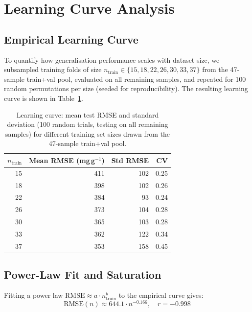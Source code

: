 \documentclass[12pt,a4paper]{article}
\begin{document}
\section{Learning Curve Analysis}
\label{sec:learning}

\subsection{Empirical Learning Curve}

To quantify how generalisation performance scales with dataset size, we
subsampled training folds of size $n_\text{train} \in \{15, 18, 22, 26,
30, 33, 37\}$ from the 47-sample train+val pool, evaluated on all
remaining samples, and repeated for 100 random permutations per size
(seeded for reproducibility).
The resulting learning curve is shown in Table~\ref{tab:learning_curve}.

\begin{table}[h]
\centering
\caption{Learning curve: mean test RMSE and standard deviation (100
  random trials, testing on all remaining samples) for different
  training set sizes drawn from the 47-sample train+val pool.}
\label{tab:learning_curve}
\begin{tabular}{rrrr}
\toprule
$n_\text{train}$ & Mean RMSE (mg\,g$^{-1}$) & Std RMSE & CV \\
\midrule
15 & 411 & 102 & 0.25 \\
18 & 398 & 102 & 0.26 \\
22 & 384 &  93 & 0.24 \\
26 & 373 & 104 & 0.28 \\
30 & 365 & 103 & 0.28 \\
33 & 362 & 122 & 0.34 \\
37 & 353 & 158 & 0.45 \\
\bottomrule
\end{tabular}
\end{table}

\subsection{Power-Law Fit and Saturation}

Fitting a power law $\text{RMSE} \approx a \cdot n_\text{train}^{b}$
to the empirical curve gives:
\begin{equation}
\text{RMSE}(n) \approx 644.1 \cdot n^{-0.166}, \quad r = -0.998
\end{equation}
\end{document}
